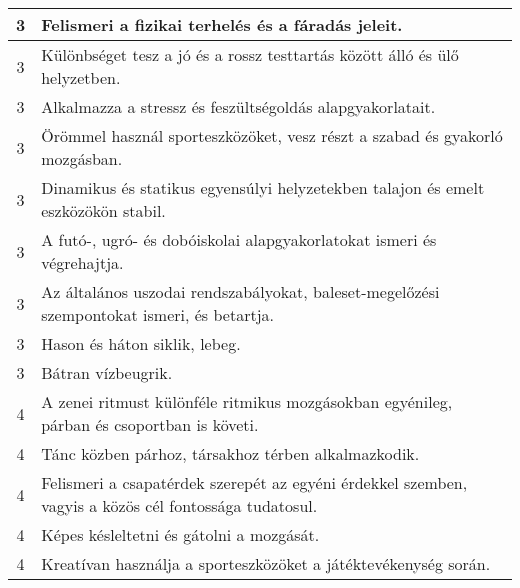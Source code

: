 \begin{longtable}{c | p{12cm} }
                                
                                          3 &  Felismeri a fizikai terhelés és a fáradás jeleit. \\ \hline
                                          3 &  Különbséget tesz a jó és a rossz testtartás között álló és ülő helyzetben. \\ \hline
                                          3 &  Alkalmazza a stressz és feszültségoldás alapgyakorlatait. \\ \hline
                                          3 &  Örömmel használ sporteszközöket, vesz részt a szabad és gyakorló mozgásban. \\ \hline
                                          3 &  Dinamikus és statikus egyensúlyi helyzetekben talajon és emelt eszközökön stabil. \\ \hline
                                          3 &  A futó-, ugró- és dobóiskolai alapgyakorlatokat ismeri és végrehajtja. \\ \hline
                                          3 &  Az általános uszodai rendszabályokat, baleset-megelőzési szempontokat ismeri, és betartja. \\ \hline
                                          3 &  Hason és háton siklik, lebeg. \\ \hline
                                          3 &  Bátran vízbeugrik. \\ \hline
                                      
                                
                                          4 &  A zenei ritmust különféle ritmikus mozgásokban egyénileg, párban és csoportban is követi. \\ \hline
                                          4 &  Tánc közben párhoz, társakhoz térben alkalmazkodik. \\ \hline
                                          4 &  Felismeri a csapatérdek szerepét az egyéni érdekkel szemben, vagyis a közös cél fontossága tudatosul. \\ \hline
                                          4 &  Képes késleltetni és gátolni a mozgását. \\ \hline
                                          4 &  Kreatívan használja a sporteszközöket a játéktevékenység során. \\ \hline
                                      
                        \end{longtable}
            \clearpage

